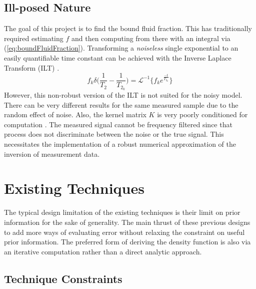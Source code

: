 \subsection{Ill-posed Nature}
The goal of this project is to find the bound fluid fraction. This has traditionally required estimating $f$ and then computing from there with an integral via (\ref{eq:boundFluidFraction}). Transforming a \textit{noiseless} single exponential to an easily quantifiable time constant can be achieved with the Inverse Laplace Transform (ILT) \cite{BulterReedsDawsonMethod1981}.
\begin{equation}
   f_k\delta   \bigg(   \frac{1}{T_{2}} - \frac{1}{T_{2_k}} \bigg) = \mathcal{L}^{-1} \bigg\{ f_k e^{\frac{-t}{T_{2_k}}} \bigg\}
    \label{eq:InverseLaplaceNaive}
\end{equation}
However, this non-robust version of the ILT is not suited for the noisy model. There can be very different results for the same measured sample due to the random effect of noise. Also, the kernel matrix $K$ is very poorly conditioned for computation \cite{NumericalFredholm1971hanson1971numerical}. The measured signal cannot be frequency filtered since that process does not discriminate between the noise or the true signal. This necessitates the implementation of a robust numerical approximation of the inversion of measurement data.





\section{Existing Techniques}
\label{Sec:existing_techniques}
The typical design limitation of the existing techniques is their limit on prior information for the sake of generality. The main thrust of these previous designs to add more ways of evaluating error without relaxing the constraint on useful prior information. The preferred form of deriving the density function is also via an iterative computation rather than a direct analytic approach.


\subsection{Technique Constraints}\label{subsection:techniqueConstraints}

